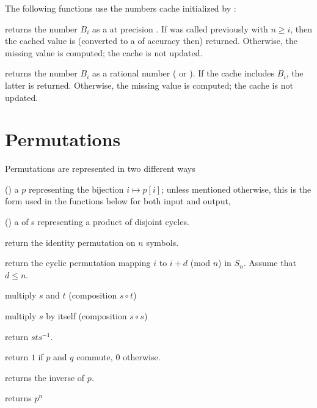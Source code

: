 The following functions use the  numbers cache initialized by
:

 returns the  number
$B_i$ as a  at precision . If 
was called previously with $n \geq i$, then the cached value is (converted to
a  of accuracy  then) returned. Otherwise, the missing
value is computed; the cache is not updated.

 returns the  number $B_i$ as a
rational number ( or ). If the  cache includes
$B_i$, the latter is returned. Otherwise, the missing value is computed; the
cache is not updated.



\section{Permutations }

\noindent Permutations are represented in two different ways

\item () a  $p$ representing the bijection $i\mapsto
p[i]$; unless mentioned otherwise, this is the form used in the functions
below for both input and output,

\item () a  of s representing a product of
disjoint cycles.

 return the identity permutation on $n$
symbols.

 return the cyclic permutation mapping
$i$ to $i+d$ (mod $n$) in $S_n$. Assume that $d \leq n$.

 multiply $s$ and $t$ (composition $s\circ t$)

 multiply $s$  by itself (composition $s\circ s$)

 return $sts^{-1}$.

 return $1$ if $p$ and $q$ commute, 0
otherwise.

 returns the inverse of $p$.

 returns $p^n$

